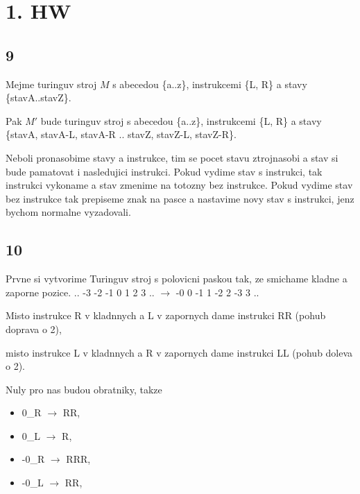 \documentclass[a4paper]{article}
\begin{document}
\pagestyle{fancy}

\section*{1. HW}
\subsection*{9}
Mejme turinguv stroj $M$ s abecedou \{a..z\}, instrukcemi \{L, R\} a stavy \{stavA..stavZ\}.

Pak $M'$ bude turinguv stroj s abecedou \{a..z\}, instrukcemi \{L, R\} a stavy \{stavA, stavA-L, stavA-R .. stavZ, stavZ-L, stavZ-R\}.  

Neboli pronasobime stavy a instrukce, tim se pocet stavu ztrojnasobi a stav si bude pamatovat i nasledujici instrukci.  
Pokud vydime stav s instrukci, tak instrukci vykoname a stav zmenime na totozny bez instrukce.
Pokud vydime stav bez instrukce tak prepiseme znak na pasce a nastavime novy stav s instrukci, jenz bychom normalne vyzadovali.

\subsection*{10}
Prvne si vytvorime Turinguv stroj s polovicni paskou tak, ze smichame kladne a zaporne pozice.  
.. -3 -2 -1 0 1 2 3 .. $\rightarrow$ -0 0 -1 1 -2 2 -3 3 ..  

Misto instrukce R v kladnnych a L v zapornych dame instrukci RR (pohub doprava o 2),  

misto instrukce L v kladnnych a R v zapornych dame instrukci LL (pohub doleva o 2).

Nuly pro nas budou obratniky, takze
\begin{itemize}
    \item 0\_R $\rightarrow$ RR,
    \item 0\_L $\rightarrow$ R, 
    \item -0\_R $\rightarrow$ RRR, 
    \item -0\_L $\rightarrow$ RR, 
\end{itemize}
\end{document}
